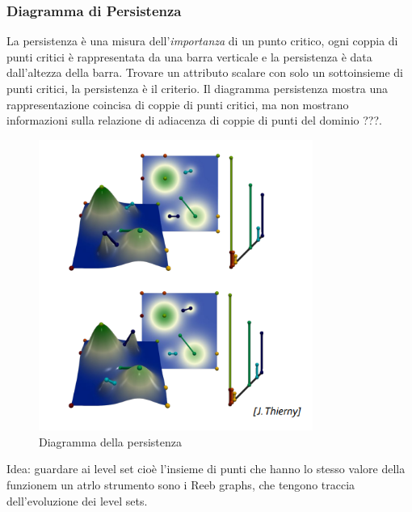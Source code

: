 \subsubsection{Diagramma di Persistenza}
La persistenza è una misura dell'\textit{importanza} di un punto critico, ogni coppia di punti critici è rappresentata da una barra verticale e la persistenza è data dall'altezza della barra.
Trovare un attributo scalare con solo un sottoinsieme di punti critici, la persistenza è il criterio.
Il diagramma persistenza mostra una rappresentazione coincisa di coppie di punti critici, ma non mostrano informazioni sulla relazione di adiacenza di coppie di punti del dominio ???.
\begin{figure}[H]
    \centering
    \includegraphics[width=0.8\textwidth]{images/DiagPers.png} 
    \caption{Diagramma della persistenza}
    \label{fig:immagine}
\end{figure}
Idea: guardare ai level set cioè l'insieme di punti che hanno lo stesso valore della funzionem un atrlo strumento sono i Reeb graphs, che tengono traccia dell'evoluzione dei level sets.

